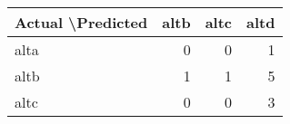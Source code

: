\begin{tabular}{lrrr}
\toprule
Actual \textbackslash   Predicted &  altb &  altc &  altd \\
\midrule
               alta &     0 &     0 &     1 \\
               altb &     1 &     1 &     5 \\
               altc &     0 &     0 &     3 \\
\bottomrule
\end{tabular}
